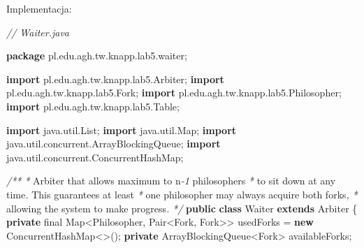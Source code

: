 \documentclass[11pt]{article}
\newenvironment{Shaded}{}{}
\newcommand{\KeywordTok}[1]{\textcolor[rgb]{0.00,0.44,0.13}{\textbf{{#1}}}}
\newcommand{\DataTypeTok}[1]{\textcolor[rgb]{0.56,0.13,0.00}{{#1}}}
\newcommand{\CommentTok}[1]{\textcolor[rgb]{0.38,0.63,0.69}{\textit{{#1}}}}
\newcommand{\NormalTok}[1]{{#1}}
\newcommand{\ImportTok}[1]{{#1}}
\newcommand{\OperatorTok}[1]{\textcolor[rgb]{0.40,0.40,0.40}{{#1}}}
\newcommand{\BuiltInTok}[1]{{#1}}
\begin{document}
Implementacja:

\begin{Shaded}
\begin{Highlighting}[]
\CommentTok{// Waiter.java}

\KeywordTok{package}\ImportTok{ pl}\OperatorTok{.}\ImportTok{edu}\OperatorTok{.}\ImportTok{agh}\OperatorTok{.}\ImportTok{tw}\OperatorTok{.}\ImportTok{knapp}\OperatorTok{.}\ImportTok{lab5}\OperatorTok{.}\ImportTok{waiter}\OperatorTok{;}

\KeywordTok{import} \ImportTok{pl}\OperatorTok{.}\ImportTok{edu}\OperatorTok{.}\ImportTok{agh}\OperatorTok{.}\ImportTok{tw}\OperatorTok{.}\ImportTok{knapp}\OperatorTok{.}\ImportTok{lab5}\OperatorTok{.}\ImportTok{Arbiter}\OperatorTok{;}
\KeywordTok{import} \ImportTok{pl}\OperatorTok{.}\ImportTok{edu}\OperatorTok{.}\ImportTok{agh}\OperatorTok{.}\ImportTok{tw}\OperatorTok{.}\ImportTok{knapp}\OperatorTok{.}\ImportTok{lab5}\OperatorTok{.}\ImportTok{Fork}\OperatorTok{;}
\KeywordTok{import} \ImportTok{pl}\OperatorTok{.}\ImportTok{edu}\OperatorTok{.}\ImportTok{agh}\OperatorTok{.}\ImportTok{tw}\OperatorTok{.}\ImportTok{knapp}\OperatorTok{.}\ImportTok{lab5}\OperatorTok{.}\ImportTok{Philosopher}\OperatorTok{;}
\KeywordTok{import} \ImportTok{pl}\OperatorTok{.}\ImportTok{edu}\OperatorTok{.}\ImportTok{agh}\OperatorTok{.}\ImportTok{tw}\OperatorTok{.}\ImportTok{knapp}\OperatorTok{.}\ImportTok{lab5}\OperatorTok{.}\ImportTok{Table}\OperatorTok{;}

\KeywordTok{import} \ImportTok{java}\OperatorTok{.}\ImportTok{util}\OperatorTok{.}\ImportTok{List}\OperatorTok{;}
\KeywordTok{import} \ImportTok{java}\OperatorTok{.}\ImportTok{util}\OperatorTok{.}\ImportTok{Map}\OperatorTok{;}
\KeywordTok{import} \ImportTok{java}\OperatorTok{.}\ImportTok{util}\OperatorTok{.}\ImportTok{concurrent}\OperatorTok{.}\ImportTok{ArrayBlockingQueue}\OperatorTok{;}
\KeywordTok{import} \ImportTok{java}\OperatorTok{.}\ImportTok{util}\OperatorTok{.}\ImportTok{concurrent}\OperatorTok{.}\ImportTok{ConcurrentHashMap}\OperatorTok{;}

\CommentTok{/**}
 \CommentTok{*}\NormalTok{ Arbiter that allows maximum to n}\CommentTok{{-}1}\NormalTok{ philosophers}
 \CommentTok{*}\NormalTok{ to sit down at any time}\CommentTok{. }\NormalTok{This guarantees at least}
 \CommentTok{*}\NormalTok{ one philosopher may always acquire both forks}\CommentTok{,}
 \CommentTok{*}\NormalTok{ allowing the system to make progress}\CommentTok{.}
 \CommentTok{*/}
\KeywordTok{public} \KeywordTok{class}\NormalTok{ Waiter }\KeywordTok{extends}\NormalTok{ Arbiter }\OperatorTok{\{}
    \KeywordTok{private} \DataTypeTok{final} \BuiltInTok{Map}\OperatorTok{\textless{}}\NormalTok{Philosopher}\OperatorTok{,}\NormalTok{ Pair}\OperatorTok{\textless{}}\NormalTok{Fork}\OperatorTok{,}\NormalTok{ Fork}\OperatorTok{\textgreater{}\textgreater{}}\NormalTok{ usedForks }\OperatorTok{=} \KeywordTok{new} \BuiltInTok{ConcurrentHashMap}\OperatorTok{\textless{}\textgreater{}();}
    \KeywordTok{private} \BuiltInTok{ArrayBlockingQueue}\OperatorTok{\textless{}}\NormalTok{Fork}\OperatorTok{\textgreater{}}\NormalTok{ availableForks}\OperatorTok{;}


\end{Highlighting}
\end{Shaded}
\end{document}
